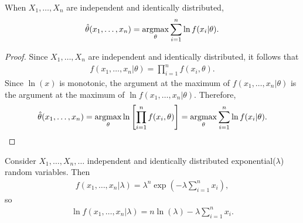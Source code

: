 \begin{prop}
    When $X_1, \ldots, X_n$ are independent and identically distributed,
    \begin{align*}
        \hat{\theta}(x_1, \ldots, x_n) = \operatorname*{argmax}_{\theta}\sum_{i=1}^{n}\ln f(x_i|\theta).
    \end{align*}
\end{prop}

\begin{proof}
    Since $X_1, \ldots, X_n$ are independent and identically distributed, it follows that
    \begin{align*}
        f(x_1, \ldots, x_n | \theta) = \prod_{i=1}^{n}f(x_i,\theta).
    \end{align*}
    Since $\ln(x)$ is monotonic, the argument at the maximum of $f(x_1, \ldots, x_n|\theta)$ is the argument at the maximum of $\ln f(x_1, \ldots, x_n|\theta)$. Therefore,
    \begin{align*}
        \hat{\theta}(x_1, \ldots, x_n) = \operatorname*{argmax}_{\theta}\ln\left[\prod_{i=1}^{n}f(x_i,\theta)\right] = \operatorname*{argmax}_{\theta}\sum_{i=1}^{n}\ln f(x_i|\theta).
    \end{align*}
\end{proof}

\begin{exmp}
    Consider $X_1, \ldots, X_n, \ldots$ independent and identically distributed exponential($\lambda$) random variables. Then
    \begin{align*}
        f(x_1, \ldots, x_n|\lambda) = \lambda^n\exp\left(-\lambda\sum_{i=1}^{n}x_i\right),
    \end{align*}
    so
    \begin{align*}
        \ln f(x_1, \ldots, x_n|\lambda) = n\ln(\lambda) - \lambda\sum_{i=1}^{n}x_i.
    \end{align*}
\end{exmp}

